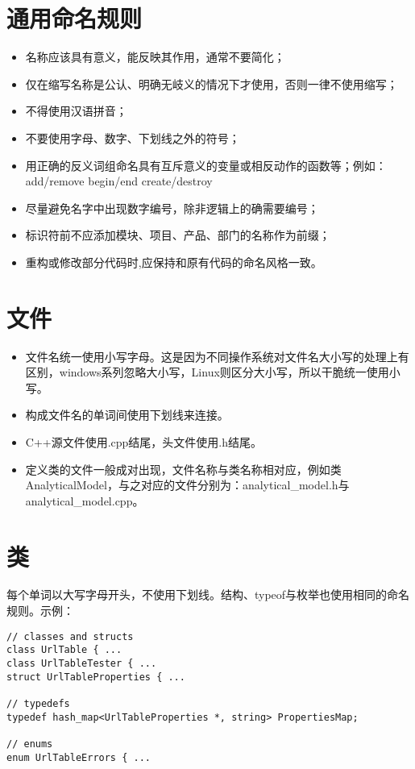 \section{通用命名规则}
\begin{itemize}
  \item 名称应该具有意义，能反映其作用，通常不要简化；
  \item 仅在缩写名称是公认、明确无岐义的情况下才使用，否则一律不使用缩写；
  \item 不得使用汉语拼音；
  \item 不要使用字母、数字、下划线之外的符号；
  \item 用正确的反义词组命名具有互斥意义的变量或相反动作的函数等；例如：\\
  add/remove  begin/end  create/destroy
  \item 尽量避免名字中出现数字编号，除非逻辑上的确需要编号；
  \item 标识符前不应添加模块、项目、产品、部门的名称作为前缀；
  \item 重构或修改部分代码时,应保持和原有代码的命名风格一致。
\end{itemize}


\section{文件}
\begin{itemize}
  \item 文件名统一使用小写字母。这是因为不同操作系统对文件名大小写的处理上有区别，windows系列忽略大小写，Linux则区分大小写，所以干脆统一使用小写。
  \item 构成文件名的单词间使用下划线来连接。
  \item C++源文件使用.cpp结尾，头文件使用.h结尾。
  \item 定义类的文件一般成对出现，文件名称与类名称相对应，例如类AnalyticalModel，与之对应的文件分别为：analytical\_model.h与analytical\_model.cpp。
\end{itemize}


\section{类}
每个单词以大写字母开头，不使用下划线。结构、typeof与枚举也使用相同的命名规则。示例：
\begin{verbatim}
// classes and structs
class UrlTable { ...
class UrlTableTester { ...
struct UrlTableProperties { ...

// typedefs
typedef hash_map<UrlTableProperties *, string> PropertiesMap;

// enums
enum UrlTableErrors { ...
\end{verbatim}

